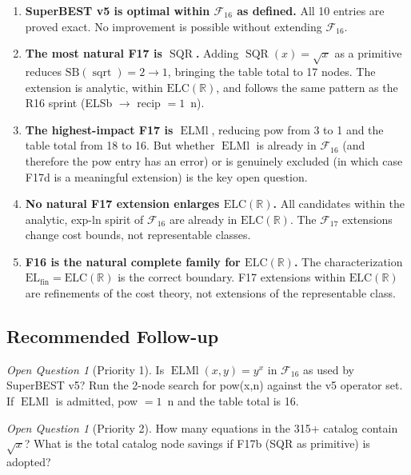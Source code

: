 \documentclass[12pt,a4paper]{article}
\theoremstyle{definition}
\theoremstyle{remark}
\newtheorem{openq}[theorem]{Open Question}
\newcommand{\ELMl}{\operatorname{ELMl}}
\newcommand{\sqrtop}{\operatorname{sqrt}}
\newcommand{\SQR}{\operatorname{SQR}}
\newcommand{\SB}{\mathrm{SB}}
\newcommand{\F}{\mathcal{F}_{16}}
\newcommand{\ELC}{\mathrm{ELC}(\mathbb{R})}
\newcommand{\ELfin}{\mathrm{EL}_{\mathrm{fin}}}
\begin{document}
\begin{enumerate}
  \item \textbf{SuperBEST v5 is optimal within $\F$ as defined.}  All 10 entries
    are proved exact.  No improvement is possible without extending $\F$.

  \item \textbf{The most natural F17 is $\SQR$.}  Adding $\SQR(x) = \sqrt{x}$
    as a primitive reduces $\SB(\sqrtop) = 2 \to 1$, bringing the table total
    to 17 nodes.  The extension is analytic, within $\ELC$, and follows the
    same pattern as the R16 sprint (ELSb $\to$ recip $= 1$~n).

  \item \textbf{The highest-impact F17 is $\ELMl$}, reducing pow from 3 to
    1 and the table total from 18 to 16.  But whether $\ELMl$ is already in
    $\F$ (and therefore the pow entry has an error) or is genuinely excluded
    (in which case F17d is a meaningful extension) is the key open question.

  \item \textbf{No natural F17 extension enlarges $\ELC$.}  All candidates
    within the analytic, exp-ln spirit of $\F$ are already in $\ELC$.
    The $\mathcal{F}_{17}$ extensions change cost bounds, not representable classes.

  \item \textbf{F16 is the natural complete family for $\ELC$.}  The
    characterization $\ELfin = \ELC$ \cite{F16Char} is the correct boundary.
    F17 extensions within $\ELC$ are refinements of the cost theory, not
    extensions of the representable class.
\end{enumerate}

\subsection{Recommended Follow-up}

\begin{openq}[Priority 1]
Is $\ELMl(x,y) = y^x$ in $\mathcal{F}_{16}$ as used by SuperBEST v5?
Run the 2-node search for pow(x,n) against the v5 operator set.
If $\ELMl$ is admitted, pow $= 1$~n and the table total is 16.
\end{openq}

\begin{openq}[Priority 2]
How many equations in the 315+ catalog contain $\sqrt{x}$?
What is the total catalog node savings if F17b (SQR as primitive) is adopted?
\end{openq}
\end{document}
